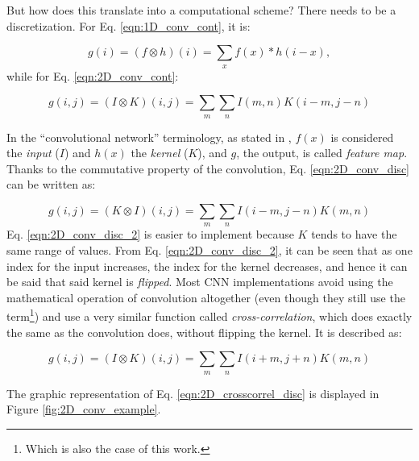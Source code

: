 \documentclass[../main.tex]{subfiles}
\begin{document}
But how does this translate into a computational scheme? There needs to be a discretization. For Eq. \ref{eqn:1D_conv_cont}, it is:

\begin{equation}
    g(i) = (f \otimes h)(i) = \sum_{x} f(x)*h(i-x),
\end{equation}
while for Eq. \ref{eqn:2D_conv_cont}:

\begin{equation} \label{eqn:2D_conv_disc}
    g(i,j) = (I \otimes K)(i,j) = \sum_{m} \sum_{n} I(m,n)K(i-m,j-n)
\end{equation}

In the ``convolutional network'' terminology, as stated in \cite{deep_learning_IGoodfellow}, $f(x)$ is considered the \textit{input} ($I$) and $h(x)$ the \textit{kernel} ($K$), and $g$, the output, is called \textit{feature map}. Thanks to the commutative property of the convolution, Eq. \ref{eqn:2D_conv_disc} can be written as: 

\begin{equation} \label{eqn:2D_conv_disc_2}
    g(i,j) = (K \otimes I)(i,j) = \sum_{m} \sum_{n} I(i-m,j-n)K(m,n)
\end{equation}
Eq. \ref{eqn:2D_conv_disc_2} is easier to implement because $K$ tends to have the same range of values. From Eq. \ref{eqn:2D_conv_disc_2}, it can be seen that as one index for the input increases, the index for the kernel decreases, and hence it can be said that said kernel is \textit{flipped}. Most CNN implementations avoid using the mathematical operation of convolution altogether (even though they still use the term\footnote{Which is also the case of this work.}) and use a very similar function called \textit{cross-correlation}, which does exactly the same as the convolution does, without flipping the kernel. It is described as:

\begin{equation} \label{eqn:2D_crosscorrel_disc}
    g(i,j) = (I \otimes K)(i,j) = \sum_{m} \sum_{n} I(i+m,j+n)K(m,n)
\end{equation}

The graphic representation of Eq. \ref{eqn:2D_crosscorrel_disc} is displayed in Figure \ref{fig:2D_conv_example}.
\end{document}
